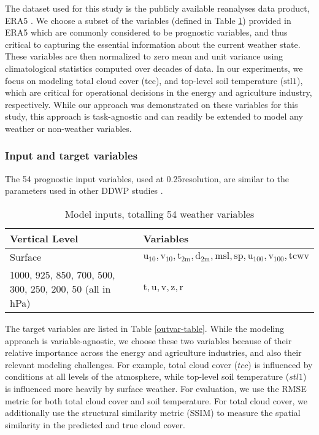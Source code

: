 \documentclass{article}
\begin{document}
The dataset used for this study is the publicly available reanalyses data product, ERA5 \cite{hersbach2020era5}. We choose a subset of the variables (defined in Table \ref{var-table}) provided in ERA5 which are commonly considered to be prognostic variables, and thus critical to capturing the essential information about the current weather state. These variables are then normalized to zero mean and unit variance using climatological statistics computed over decades of data. In our experiments, we focus on modeling total cloud cover ($\mathrm{tcc}$), and top-level soil temperature ($\mathrm{stl1}$), which are critical for operational decisions in the energy and agriculture industry, respectively. While our approach was demonstrated on these variables for this study, this approach is task-agnostic and can readily be extended to model any weather or non-weather variables.

\subsubsection{Input and target variables}

The 54 prognostic input variables, used at 0.25\textdegree resolution, are similar to the parameters used in other DDWP studies \cite{pathak2022fourcastnet, bi2023accurate}.  

\begin{table}[ht]
  \caption{Model inputs, totalling 54 weather variables}
  \label{var-table}
  \centering
  \begin{tabular}{ll}
    \toprule
    Vertical Level    & Variables   \\
    \midrule
    Surface & $\mathrm{u_{10}, v_{10}, t_{2m}, d_{2m}, msl, sp, u_{100}, v_{100}, tcwv}$  \\
    \midrule
   1000, 925, 850, 700, 500, 300, 250, 200, 50  (all in hPa)  & $\mathrm{t, u,  v, z, r}$     \\
    \bottomrule
  \end{tabular}
\end{table}

The target variables are listed in Table \ref{outvar-table}. While the modeling approach is variable-agnostic, we choose these two variables because of their relative importance across the energy and agriculture industries, and also their relevant modeling challenges. For example, total cloud cover ($\textit{tcc}$) is influenced by conditions at all levels of the atmosphere, while top-level soil temperature ($\textit{stl1}$) is influenced more heavily by surface weather. For evaluation, we use the RMSE metric for both total cloud cover and soil temperature. For total cloud cover, we additionally use the structural similarity metric (SSIM) to measure the spatial similarity in the predicted and true cloud cover.
\end{document}
